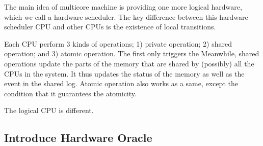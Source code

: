 The main idea of multicore machine is providing one more logical hardware, which we call a hardware scheduler. 
The key difference between this hardware scheduler CPU and other CPUs is the existence of local transitions. 

Each CPU perform 3 kinds of operations; 1) private operation; 2) shared operation; and 3) atomic operation.
The first only triggers the 
Meanwhile, shared operations update the parts of the memory that are shared by (possibly) all the CPUs in the system. 
It thus updates the status of the memory as well as the event in the shared log. 
Atomic operation also works as a same, except the condition that it guarantees the atomicity. 

The logical CPU is different. 

\clearpage

\subsection{Introduce Hardware Oracle}
\label{subsec:hworacle}


